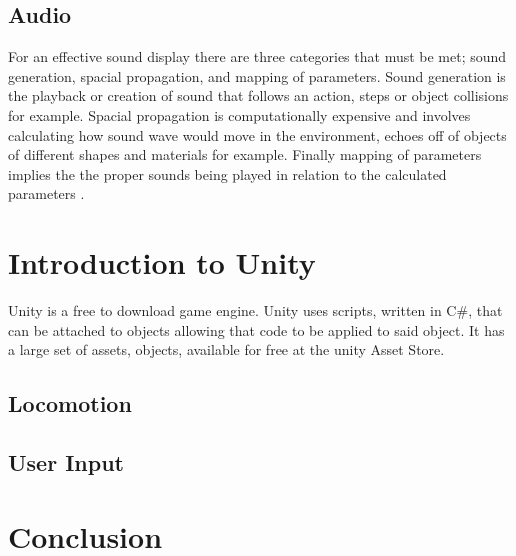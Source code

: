 \subsection{Audio}
For an effective sound display there are three categories that must be met; sound generation, spacial propagation, and mapping of parameters. Sound generation is the playback or creation of sound that follows an action, steps or object collisions for example. Spacial propagation is computationally expensive and involves calculating how sound wave would move in the environment, echoes off of objects of different shapes and materials for example. Finally mapping of parameters implies the the proper sounds being played in relation to the calculated parameters \cite{Mazuryk}. 


\section{Introduction to Unity}
Unity is a free to download game engine. Unity uses scripts, written in C\#, that can be attached to objects allowing that code to be applied to said object. It has a large set of assets, objects, available for free at the unity Asset Store. 


\subsection{Locomotion}

\subsection{User Input}



\section{Conclusion}




